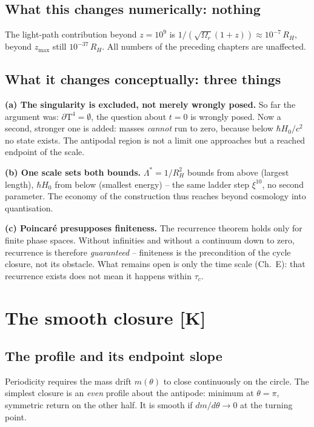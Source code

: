 \section{What this changes numerically: nothing}

The light-path contribution beyond $z = 10^9$ is
$1/(\sqrt{\Omega_r}(1{+}z)) \approx 10^{-7}\,R_H$, beyond
$z_\text{max}$ still $10^{-37}\,R_H$. All numbers of the
preceding chapters are unaffected.

\section{What it changes conceptually: three things}

\textbf{(a) The singularity is excluded, not merely wrongly
posed.} So far the argument was: $\partial\text{T}^4 =
\emptyset$, the question about $t=0$ is wrongly posed. Now a
second, stronger one is added: masses \emph{cannot} run to zero,
because below $\hbar H_0/c^2$ no state exists. The antipodal
region is not a limit one approaches but a reached endpoint of the
scale.

\textbf{(b) One scale sets both bounds.} $\Lambda^{*} = 1/R_H^2$
bounds from above (largest length), $\hbar H_0$ from below
(smallest energy) -- the same ladder step $\xi^{10}$, no second
parameter. The economy of the construction thus reaches beyond
cosmology into quantisation.

\textbf{(c) Poincaré presupposes finiteness.} The recurrence
theorem holds only for finite phase spaces. Without infinities and
without a continuum down to zero, recurrence is therefore
\emph{guaranteed} -- finiteness is the precondition of the cycle
closure, not its obstacle. What remains open is only the time
scale (Ch.~E): that recurrence exists does not mean it happens
within $\tau_c$.

\chapter{The smooth closure [K]}

\section{The profile and its endpoint slope}

Periodicity requires the mass drift $m(\theta)$ to close
continuously on the circle. The simplest closure is an \emph{even}
profile about the antipode: minimum at $\theta=\pi$, symmetric
return on the other half. It is smooth if $dm/d\theta \to 0$ at
the turning point.

